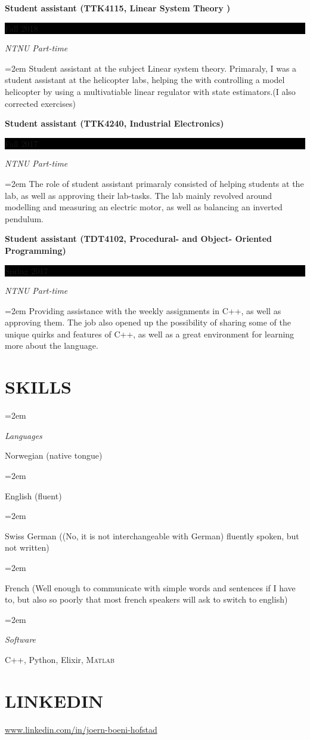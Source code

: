 \documentclass[paper=a4,fontsize=11pt,norsk]{scrartcl} %
\newlength{\spacebox}
\newcommand{\NewPart}[1]{\section*{\uppercase{#1}}}
\newcommand{\PersonalEntry}[2]{
		\noindent\hangindent=2em\hangafter=0 %
		\parbox{\spacebox}{        %
		\textit{#1}}		       %
		\hspace{1.5em} #2 \par}    %
\newcommand{\SkillsEntry}[2]{      %
		\noindent\hangindent=2em\hangafter=0 %
		\parbox{\spacebox}{        %
		\textit{#1}}			   %
		\hspace{1.5em} #2 \par}    %
\newcommand{\EducationEntry}[4]{
		\noindent \textbf{#1} \hfill      %
		\colorbox{Black}{%
			\parbox{6em}{%
			\hfill\color{White}#2}} \par  %
		\noindent \textit{#3} \par        %
		\noindent\hangindent=2em\hangafter=0 \small #4 %
		\normalsize \par}
\begin{document}
\EducationEntry{Student assistant (TTK4115, Linear System Theory )}{Fall 2018}{NTNU Part-time}
{Student assistant at the subject Linear system theory. Primaraly, I was a student assistant at the helicopter labs, helping the with controlling a model helicopter by using a multivatiable linear regulator with state estimators.(I also corrected exercises) 
}
\EducationEntry{Student assistant (TTK4240, Industrial Electronics)}{Fall 2017}{NTNU Part-time}
{The role of student assistant primaraly consisted of helping students at the lab, as well as approving their lab-tasks. 
The lab mainly revolved around modelling and measuring an electric motor, as well as balancing an inverted pendulum.
}

\EducationEntry{Student assistant (TDT4102, Procedural- and Object- Oriented     Programming)}{Spring 2017}{NTNU Part-time}
{Providing assistance with the weekly assignments in C++, as well as approving them. The job also opened up the possibility of sharing some of the unique quirks and features of C++, as well as a great environment for learning more about the language.
}
\NewPart{Skills}{}

\SkillsEntry{Languages}{Norwegian (native tongue)}
\SkillsEntry{}{English (fluent)}
\SkillsEntry{}{Swiss German  ((No, it is not interchangeable with German) fluently spoken, but not  written)}
\SkillsEntry{}{French (Well enough to communicate with simple words and sentences if I have to, but also so poorly that most french speakers will ask to switch to english)}

\SkillsEntry{Software}{  C++, Python, Elixir, \textsc{Matlab}}



\NewPart{Linkedin}{
\url{www.linkedin.com/in/joern-boeni-hofstad}
}
\end{document}
